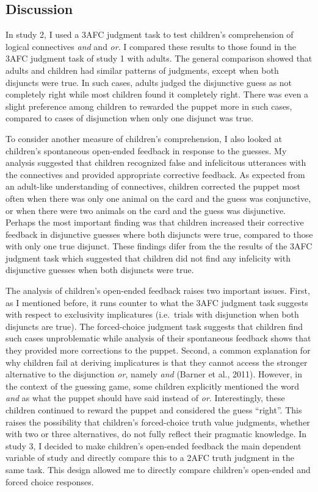 \documentclass[oneside]{report}
\theoremstyle{definition}
\theoremstyle{definition}
\theoremstyle{definition}
\theoremstyle{remark}
\begin{document}
\subsection{Discussion}\label{discussion-2}

In study 2, I used a 3AFC judgment task to test children's comprehension
of logical connectives \emph{and} and \emph{or}. I compared these
results to those found in the 3AFC judgment task of study 1 with adults.
The general comparison showed that adults and children had similar
patterns of judgments, except when both disjuncts were true. In such
cases, adults judged the disjunctive guess as not completely right while
most children found it completely right. There was even a slight
preference among children to rewarded the puppet more in such cases,
compared to cases of disjunction when only one disjunct was true.

To consider another measure of children's comprehension, I also looked
at children's spontaneous open-ended feedback in response to the
guesses. My analysis suggested that children recognized false and
infelicitous utterances with the connectives and provided appropriate
corrective feedback. As expected from an adult-like understanding of
connectives, children corrected the puppet most often when there was
only one animal on the card and the guess was conjunctive, or when there
were two animals on the card and the guess was disjunctive. Perhaps the
most important finding was that children increased their corrective
feedback in disjunctive guesses where both disjuncts were true, compared
to those with only one true disjunct. These findings difer from the the
results of the 3AFC judgment task which suggested that children did not
find any infelicity with disjunctive guesses when both disjuncts were
true.

The analysis of children's open-ended feedback raises two important
issues. First, as I mentioned before, it runs counter to what the 3AFC
judgment task suggests with respect to exclusivity implicatures
(i.e.~trials with disjunction when both disjuncts are true). The
forced-choice judgment task suggests that children find such cases
unproblematic while analysis of their spontaneous feedback shows that
they provided more corrections to the puppet. Second, a common
explanation for why children fail at deriving implicatures is that they
cannot access the stronger alternative to the disjunction \emph{or},
namely \emph{and} (Barner et al., 2011). However, in the context of the
guessing game, some children explicitly mentioned the word \emph{and} as
what the puppet should have said instead of \emph{or}. Interestingly,
these children continued to reward the puppet and considered the guess
``right''. This raises the possibility that children's forced-choice
truth value judgments, whether with two or three alternatives, do not
fully reflect their pragmatic knowledge. In study 3, I decided to make
children's open-ended feedback the main dependent variable of study and
directly compare this to a 2AFC truth judgment in the same task. This
design allowed me to directly compare children's open-ended and forced
choice responses.
\end{document}
